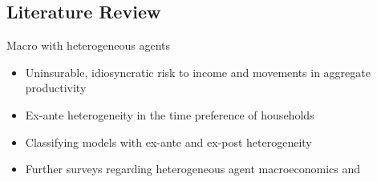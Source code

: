 \documentclass{beamer}
\begin{document}

\subsection{Literature Review}

    
    
    
    
    

\begin{frame}{Macro with heterogeneous agents}
    
    \begin{itemize}
    \item Uninsurable, idiosyncratic risk to income and movements in aggregate productivity \parencite{ks1998} 
    \item Ex-ante heterogeneity in the time preference of households \parencite{cstw2017}
    \item Classifying models with ex-ante and ex-post heterogeneity \parencite{gkgv22}
    \item Further surveys regarding heterogeneous agent macroeconomics \parencite{Guvenen2011} and \parencite{Krueger2016} 
    \end{itemize}
    
\end{frame}
\end{document}
